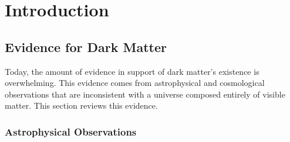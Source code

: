 \graphicspath{{img/chapter_1/}}


\chapter{Introduction}
\label{chapter:introduction}



\section{Evidence for Dark Matter}

Today, the amount of evidence in support of dark matter's existence is overwhelming. This evidence comes from astrophysical and cosmological observations that are inconsistent with a universe composed entirely of visible matter. This section reviews this evidence. 

\subsection{Astrophysical Observations}

